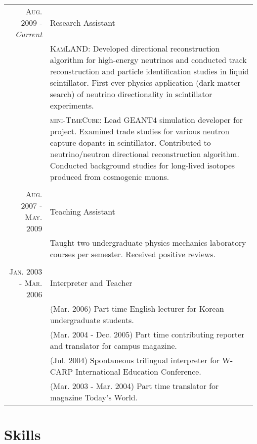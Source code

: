 \documentclass[a4paper,10pt]{article} %
\begin{document}
\begin{tabular}{r|p{10.4cm}}
\textsc{Aug. 2009 - }\textit{Current} & Research Assistant\\
& \footnotesize{
	\textsc{KamLAND}: Developed directional reconstruction algorithm for
	high-energy neutrinos and conducted track reconstruction and
	particle identification studies in liquid scintillator.
	First ever physics application (dark matter search) of neutrino
	directionality in scintillator experiments.
}\\
& \footnotesize{
	\textsc{mini-TimeCube}: Lead GEANT4 simulation developer for project.
	Examined trade studies for various neutron capture dopants in
	scintillator.
	Contributed to neutrino/neutron directional reconstruction algorithm.
	Conducted background studies for long-lived isotopes produced from
	cosmogenic muons.
}\\
\multicolumn{2}{c}{} \\


\textsc{Aug. 2007 - May. 2009} & Teaching Assistant\\
& \footnotesize{
	Taught two undergraduate physics mechanics laboratory courses per semester.
	Received positive reviews.
}\\
\multicolumn{2}{c}{} \\


\textsc{Jan. 2003 - Mar. 2006} & Interpreter and Teacher\\
& \footnotesize{(Mar. 2006) Part time English lecturer for Korean undergraduate
students.}\\
& \footnotesize{(Mar. 2004 - Dec. 2005) Part time contributing reporter and
translator for campus magazine.}\\
& \footnotesize{(Jul. 2004) Spontaneous trilingual interpreter for W-CARP
International Education Conference.}\\
& \footnotesize{(Mar. 2003 - Mar. 2004) Part time translator for magazine Today's World.}\\
\end{tabular}


\section{Skills}
\end{document}
